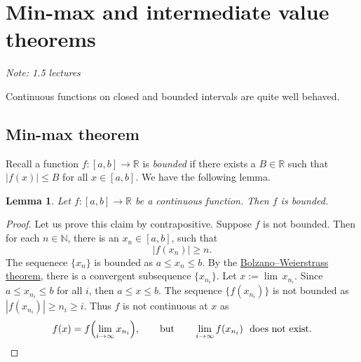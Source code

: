 \documentclass[12pt]{book}
\newcommand{\abs}[1]{\left\lvert {#1} \right\rvert}
\newcommand{\R}{{\mathbb{R}}}
\newcommand{\N}{{\mathbb{N}}}
\newcommand{\sectionnotes}[1]{\noindent \emph{Note: #1} \medskip \par}
\newcommand{\sectionnewpage}{\clearpage}
\theoremstyle{plain}
\newtheorem{lemma}[thm]{Lemma}
\theoremstyle{remark}
\theoremstyle{definition}
\theoremstyle{exercise}
\theoremstyle{example}
\begin{document}

\sectionnewpage
\section{Min-max and intermediate value theorems}
\label{sec:minmaxint}

\sectionnotes{1.5 lectures}

Continuous functions on closed and bounded intervals
are quite well behaved.

\subsection{Min-max theorem}

Recall a function $f \colon [a,b] \to \R$ is
\emph{bounded} if there exists a $B \in \R$ such that
$\abs{f(x)} \leq B$ for all $x \in [a,b]$.  We have the following lemma.

\begin{lemma}
Let $f \colon [a,b] \to \R$ be a continuous function.  Then $f$ is bounded.
\end{lemma}

\begin{proof}
Let us prove this claim by contrapositive.  Suppose $f$ is not bounded.
Then for each
$n \in \N$, there is an $x_n \in [a,b]$, such that
\begin{equation*}
\abs{f(x_n)} \geq n .
\end{equation*}
The sequenece $\{ x_n \}$ is bounded as $a \leq x_n \leq b$.
By the \hyperref[thm:bwseq]{Bolzano--Weierstrass theorem},
there is a convergent subsequence $\{ x_{n_i} \}$.  Let $x := \lim\, x_{n_i}$.
Since $a \leq x_{n_i} \leq b$ for all $i$, then $a \leq x \leq b$.
The sequence $\{ f(x_{n_i}) \}$ is not bounded 
as 
$\abs{f(x_{n_i})} \geq n_i \geq i$.
Thus $f$ is not continuous at $x$ as
\begin{equation*}
f(x)
=
f\Bigl( \lim_{i\to\infty} x_{n_i} \Bigr) ,
\qquad\text{but}\qquad
\lim_{i\to\infty} f(x_{n_i}) ~~\text{does not exist.} \qedhere
\end{equation*}
\end{proof}
\end{document}
